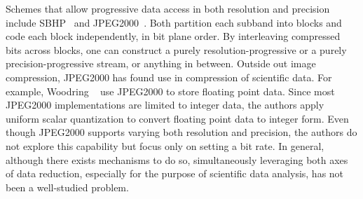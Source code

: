 Schemes that allow progressive data access in both resolution and precision include
SBHP~\cite{sbhp2000} and JPEG2000~\cite{jpeg2000}. Both partition each subband into blocks and code
each block independently, in bit plane order. By interleaving compressed bits across blocks, one can
construct a purely resolution-progressive or a purely precision-progressive stream, or anything in
between. Outside out image compression, JPEG2000 has found use in compression of scientific data.
For example, Woodring \etal~\cite{woodring2011} use JPEG2000 to store floating point data. Since
most JPEG2000 implementations are limited to integer data, the authors apply uniform scalar
quantization to convert floating point data to integer form. Even though JPEG2000 supports varying
both resolution and precision, the authors do not explore this capability but focus only on setting
a bit rate. In general, although there exists mechanisms to do so, simultaneously leveraging both
axes of data reduction, especially for the purpose of scientific data analysis, has not been a
well-studied problem.

